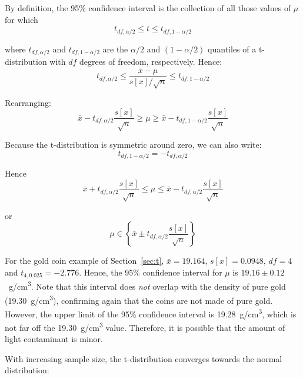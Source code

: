 By definition, the 95\% confidence interval is the collection of all
those values of $\mu$ for which
\[
t_{df,\alpha/2} \leq t \leq t_{df,1-\alpha/2}
\]

\noindent where $t_{df,\alpha/2}$ and $t_{df,1-\alpha/2}$ are the
$\alpha/2$ and $(1-\alpha/2)$ quantiles of a t-distribution with $df$
degrees of freedom, respectively.  Hence:
\[
t_{df,\alpha/2} \leq \frac{\bar{x} - \mu}{s[x]/\sqrt{n}} \leq t_{df,1-\alpha/2}
\]

Rearranging:
\[
\bar{x} - t_{df,\alpha/2}\frac{s[x]}{\sqrt{n}} \geq \mu \geq
\bar{x} - t_{df,1-\alpha/2}\frac{s[x]}{\sqrt{n}}
\]

Because the t-distribution is symmetric around zero, we can also write:
\[
t_{df,1-\alpha/2} = -t_{df,\alpha/2}
\]

Hence
\[
\bar{x} + t_{df,\alpha/2}\frac{s[x]}{\sqrt{n}} \leq \mu \leq
\bar{x} - t_{df,\alpha/2}\frac{s[x]}{\sqrt{n}}
\]

\noindent or
\begin{equation}
  \mu \in \left\{\bar{x} \pm t_{df,\alpha/2}\frac{s[x]}{\sqrt{n}}\right\}
  \label{eq:tci}
\end{equation}

For the gold coin example of Section~\ref{sec:t}, $\bar{x}=19.164$,
$s[x]=0.0948$, $df=4$ and $t_{4,0.025}=-2.776$. Hence, the 95\%
confidence interval for $\mu$ is
$19.16\pm{0.12}$~g/cm\textsuperscript{3}. Note that this interval does
\emph{not} overlap with the density of pure gold
(19.30~g/cm\textsuperscript{3}), confirming again that the coins are
not made of pure gold. However, the upper limit of the 95\% confidence
interval is 19.28~g/cm\textsuperscript{3}, which is not far off the
19.30~g/cm\textsuperscript{3} value. Therefore, it is possible that
the amount of light contaminant is minor.\medskip

With increasing sample size, the t-distribution converges towards the
normal distribution:


